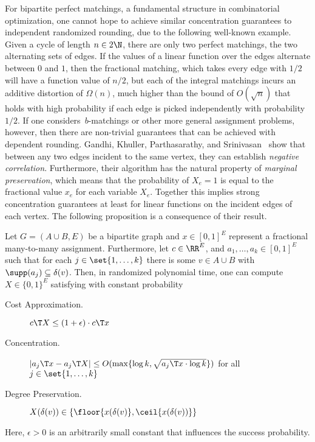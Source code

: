For bipartite perfect matchings, a fundamental structure in
combinatorial optimization, one cannot hope to achieve
similar concentration guarantees to independent randomized rounding, due to the following well-known example.
Given a cycle of length $n\in 2\N$,
there are only two perfect matchings, 
the two alternating sets of edges. If the values
of a linear function over the edges alternate between
$0$ and $1$, then the fractional matching, which takes every
edge with $1/2$ will have a function value of $n/2$, but
each of the integral matchings incurs an additive
distortion of $\Omega(n)$, much higher than the bound
of $O(\sqrt{n})$ that holds with high probability
if each edge is picked independently with probability $1/2$.
If one considers~$b$-matchings or other more general assignment problems, however, then there are non-trivial guarantees that can be achieved with dependent rounding.
Gandhi, Khuller, Parthasarathy, and Srinivasan~\cite{GandhiKPS06} 
show that between any two edges incident to the same vertex, they can establish \emph{negative correlation}. 
Furthermore, their algorithm has the natural property of \emph{marginal preservation},
which means that the probability of $X_e = 1$ is equal to the fractional value $x_e$ for each variable $X_e$.
Together this implies strong concentration guarantees at least for linear functions on the incident edges of each vertex.
The following proposition is a consequence of their result.
\begin{proposition}\label{prop:assign}
    Let $G = (A\cup B, E)$ be a bipartite graph and
    $x\in [0, 1]^{E}$ represent a fractional many-to-many assignment.
    Furthermore, let $c\in\RR^{E}$, and $a_1,\dotsc,a_k\in [0, 1]^E$ such
    that for each $j\in \set{1,\dotsc,k}$ there is some $v\in A\cup B$
    with $\supp(a_j) \subseteq \delta(v)$.
    Then, in randomized polynomial time, one can compute
    $X\in \{0, 1\}^E$ satisfying with constant probability
    \begin{description}
        \item[Cost Approximation.] \hspace{0.13cm} $c\T X \le (1 + \epsilon) \cdot c\T x$
        \item[Concentration.] \hspace{1.03cm} $|a_j\T x - a_j\T X| \le
            O(\max\{\log k, \sqrt{a_j\T x \cdot \log k}\})$ for all $j\in \set{1,\dotsc,k}$
        \item[Degree Preservation.] \hspace{0.05cm}  $X(\delta(v)) \in \{\floor{x(\delta(v)}, \ceil{x(\delta(v))} \}$
    \end{description}
    Here, $\epsilon > 0$ is an arbitrarily small constant
    that influences the success probability.
\end{proposition}

